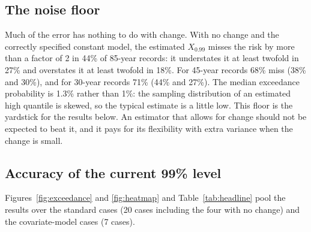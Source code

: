 \documentclass[11pt]{article}
\newcommand{\Xp}{X_{0.99}}
\begin{document}
\subsection{The noise floor}

Much of the error has nothing to do with change. With no change and the correctly specified
constant model, the estimated $\Xp$ misses the risk by more than a factor of 2 in 44\% of 85-year
records: it understates it at least twofold in 27\% and overstates it at least twofold in 18\%. For
45-year records 68\% miss (38\% and 30\%), and for 30-year records 71\% (44\% and 27\%). The median exceedance probability is 1.3\% rather than
1\%: the sampling distribution of an estimated high quantile is skewed, so the typical estimate
is a little low. This floor is the yardstick for the results below. An estimator that allows for
change should not be expected to beat it, and it pays for its flexibility with extra variance when
the change is small.

\subsection{Accuracy of the current 99\% level}

Figures~\ref{fig:exceedance} and \ref{fig:heatmap} and Table~\ref{tab:headline} pool the results
over the standard cases (20 cases including the four with no change) and the covariate-model cases
(7 cases).
\end{document}
